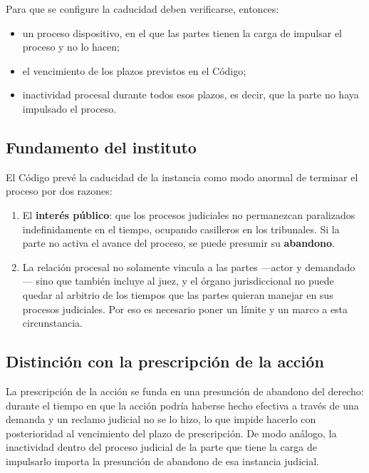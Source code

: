 \documentclass[12pt,oneside]{book}
\begin{document}
Para que se configure la caducidad deben verificarse, entonces:

\begin{itemize}
    \item un proceso dispositivo, en el que las partes tienen la carga de impulsar el proceso y no lo hacen;
    \item el vencimiento de los plazos previstos en el Código;
    \item inactividad procesal durante todos esos plazos, es decir, que la parte no haya impulsado el proceso.
\end{itemize}

\subsection{Fundamento del instituto}

El Código prevé la caducidad de la instancia como modo anormal de terminar el proceso por dos razones:

\begin{enumerate}
    \item El \textbf{interés público}: que los procesos judiciales no permanezcan paralizados indefinidamente en el tiempo, ocupando casilleros en los tribunales. Si la parte no activa el avance del proceso, se puede presumir su \textbf{abandono}.
    \item La relación procesal no solamente vincula a las partes ---actor y demandado--- sino que también incluye al juez, y el órgano jurisdiccional no puede quedar al arbitrio de los tiempos que las partes quieran manejar en sus procesos judiciales. Por eso es necesario poner un límite y un marco a esta circunstancia.
\end{enumerate}

\subsection{Distinción con la prescripción de la acción}

La prescripción de la acción se funda en una presunción de abandono del derecho: durante el tiempo en que la acción podría haberse hecho efectiva a través de una demanda y un reclamo judicial no se lo hizo, lo que impide hacerlo con posterioridad al vencimiento del plazo de prescripción. De modo análogo, la inactividad dentro del proceso judicial de la parte que tiene la carga de impulsarlo importa la presunción de abandono de esa instancia judicial.
\end{document}
